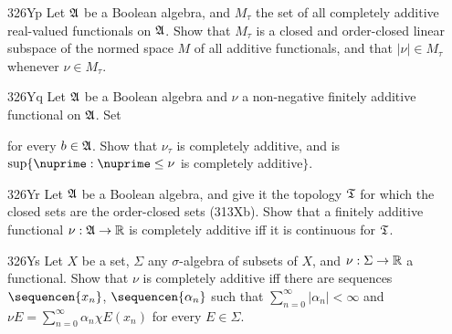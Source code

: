 {\spheader 326Yp Let $\frak A$ be a Boolean algebra, and
$M_{\tau}$ the set of all completely additive real-valued functionals on
$\frak A$.   Show that $M_{\tau}$ is a closed and order-closed linear
subspace of the normed space $M$ of all additive functionals, and that
$|\nu|\in M_{\tau}$ whenever $\nu\in M_{\tau}$.

\spheader 326Yq Let $\frak A$ be a Boolean algebra and $\nu$ a
non-negative finitely additive functional on $\frak A$.   Set


\noindent for every $b\in\frak A$.   Show that $\nu_{\tau}$ is
completely additive, and is $\sup\{\nuprime:\nuprime\le\nu$ is
completely additive$\}$.

\spheader 326Yr Let $\frak A$ be a Boolean algebra, and give it
the topology $\frak T$ for which the closed sets are the order-closed
sets (313Xb).   Show that a finitely additive functional
$\nu:\frak A\to\Bbb R$ is completely additive iff it is continuous for
$\frak T$.

\spheader 326Ys Let $X$ be a set, $\Sigma$ any $\sigma$-algebra
of subsets of $X$, and $\nu:\Sigma\to\Bbb R$ a functional.   Show that
$\nu$ is completely additive iff there are sequences $\sequencen{x_n}$,
$\sequencen{\alpha_n}$ such that $\sum_{n=0}^{\infty}|\alpha_n|<\infty$
and $\nu E=\sum_{n=0}^{\infty}\alpha_n\chi E(x_n)$ for every
$E\in\Sigma$.

}%


